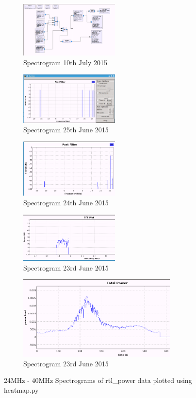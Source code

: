 \documentclass[runningheads,a4paper]{llncs}
\begin{document}
%
\begin{figure}	
	\centering
	\begin{subfigure}[t]{5cm}
		\centering
		\includegraphics[width=5cm]{images/21}
		\caption{Spectrogram 10th July 2015}
		\label{fig:gnuradio_companion_flowgraph_01} 
	\end{subfigure}
	\quad
	\begin{subfigure}[t]{5cm}
		\centering
		\includegraphics[width=5cm]{images/22}
		\caption{Spectrogram 25th June 2015}
		\label{fig:gnuradio_companion_flowgraph_02} 
	\end{subfigure}
	\quad
	\begin{subfigure}[t]{5cm}
		\centering
		\includegraphics[width=5cm]{images/23}
		\caption{Spectrogram 24th June 2015}
		\label{fig:gnuradio_companion_flowgraph_03} 
	\end{subfigure}
	\quad
	\begin{subfigure}[t]{5cm}
		\centering
		\includegraphics[width=5cm]{images/76}
		\caption{Spectrogram 23rd June 2015}
		\label{fig:gnuradio_companion_flowgraph_04} 
	\end{subfigure}
	\quad
	\begin{subfigure}[t]{8cm}
		\centering
		\includegraphics[width=8cm]{images/75}
		\caption{Spectrogram 23rd June 2015}
		\label{fig:gnuradio_companion_flowgraph_05} 
	\end{subfigure}
	\caption{24MHz - 40MHz Spectrograms of rtl\_power data plotted using heatmap.py}\label{fig:gnuradio_companion_flowgraph}
\end{figure}
%
\end{document}
